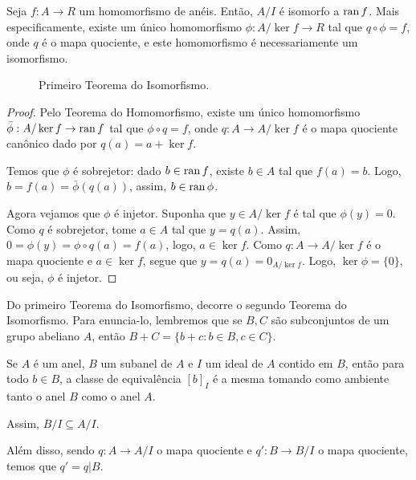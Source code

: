 \begin{theorem}
    Seja $f:A\rightarrow R$ um homomorfismo de anéis.
    Então, $A/I$ é isomorfo a $\operatorname{ran} f$.
    Mais especificamente, existe um único homomorfismo $\phi:A/\ker f\rightarrow R$ tal que $q\circ \phi=f$, onde $q$ é o mapa quociente, e este homomorfismo é necessariamente um isomorfismo.
    \begin{figure}[H]\centering
        \caption{Primeiro Teorema do Isomorfismo.}
    \end{figure}
\end{theorem}

\begin{proof}
Pelo Teorema do Homomorfismo, existe um único homomorfismo $\bar \phi:A/\ker f\rightarrow \operatorname{ran} f$ tal que $\phi\circ q=f$, onde $q:A\rightarrow A/\ker f$ é o mapa quociente canônico dado por $q(a)=a+\ker f$.

Temos que $\phi$ é sobrejetor: dado $b \in \operatorname{ran} f$, existe $b \in A$ tal que $f(a)=b$.
Logo, $b=f(a)=\bar \phi(q(a))$, assim, $b \in \operatorname{ran} \phi$.

Agora vejamos que $\phi$ é injetor.
Suponha que $y \in A/\ker f$ é tal que $\phi(y)=0$.
Como $q$ é sobrejetor, tome $a \in A$ tal que $y=q(a)$.
Assim, $0=\phi(y)=\phi\circ q(a)=f(a)$, logo, $a \in \ker f$.
Como $q:A\rightarrow A/\ker f$ é o mapa quociente e $a \in \ker f$, segue que $y=q(a)=0_{A/\ker f}$.
Logo, $\ker\phi=\{0\}$, ou seja, $\phi$ é injetor.
\end{proof}

Do primeiro Teorema do Isomorfismo, decorre o segundo Teorema do Isomorfismo.
Para enuncia-lo, lembremos que se $B, C$ são subconjuntos de um grupo abeliano $A$, então $B+C=\{b+c: b \in B, c \in C\}$.

\begin{lemma}
Se $A$ é um anel, $B$ um subanel de $A$ e $I$ um ideal de $A$ contido em $B$, então para todo $b\in B$, a classe de equivalência $[b]_I$ é a mesma tomando como ambiente tanto o anel $B$ como o anel $A$.

Assim, $B/I\subseteq A/I$.

Além disso, sendo $q:A\rightarrow A/I$ o mapa quociente e $q':B\rightarrow B/I$ o mapa quociente, temos que $q'=q|B$.
\end{lemma}

